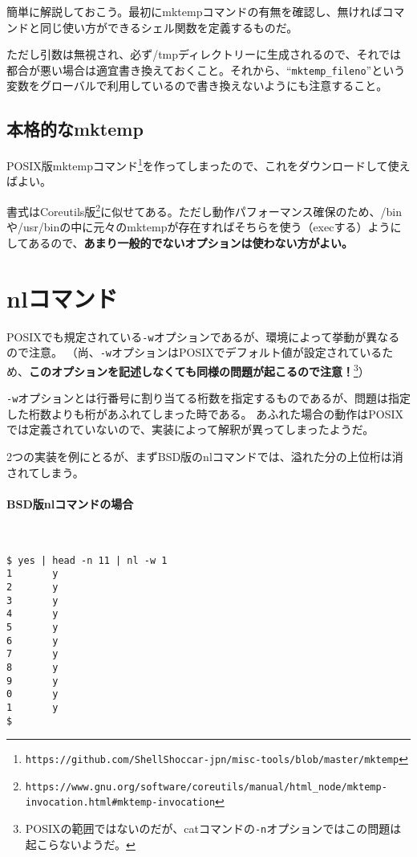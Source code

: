 簡単に解説しておこう。最初にmktempコマンドの有無を確認し、無ければコマンドと同じ使い方ができるシェル関数を定義するものだ。

ただし引数は無視され、必ず/tmpディレクトリーに生成されるので、それでは都合が悪い場合は適宜書き換えておくこと。それから、``\verb|mktemp_fileno|''という変数をグローバルで利用しているので書き換えないようにも注意すること。

\subsection*{本格的なmktemp}

POSIX版mktempコマンド\footnote{\verb|https://github.com/ShellShoccar-jpn/misc-tools/blob/master/mktemp|}を作ってしまったので、これをダウンロードして使えばよい。

書式はCoreutils版\footnote{\verb|https://www.gnu.org/software/coreutils/manual/html_node/mktemp-invocation.html#mktemp-invocation|}に似せてある。ただし動作パフォーマンス確保のため、/binや/usr/binの中に元々のmktempが存在すればそちらを使う（execする）ようにしてあるので、\textbf{あまり一般的でないオプションは使わない方がよい。}

\section{nlコマンド}

POSIXでも規定されている\verb|-w|オプションであるが、環境によって挙動が異なるので注意。
（尚、\verb|-w|オプションはPOSIXでデフォルト値が設定されているため、\textbf{このオプションを記述しなくても同様の問題が起こるので注意！}\footnote{POSIXの範囲ではないのだが、catコマンドの\verb|-n|オプションではこの問題は起こらないようだ。}）

\verb|-w|オプションとは行番号に割り当てる桁数を指定するものであるが、問題は指定した桁数よりも桁があふれてしまった時である。
あふれた場合の動作はPOSIXでは定義されていないので、実装によって解釈が異ってしまったようだ。

2つの実装を例にとるが、まずBSD版のnlコマンドでは、溢れた分の上位桁は消されてしまう。

\paragraph{BSD版nlコマンドの場合} 　\\
\begin{screen}
	\verb!$ yes | head -n 11 | nl -w 1! \return \\
	\verb|1       y| \\
	\verb|2       y| \\
	\verb|3       y| \\
	\verb|4       y| \\
	\verb|5       y| \\
	\verb|6       y| \\
	\verb|7       y| \\
	\verb|8       y| \\
	\verb|9       y| \\
	\verb|0       y| \\
	\verb|1       y| \\
	\verb|$ |
\end{screen}

